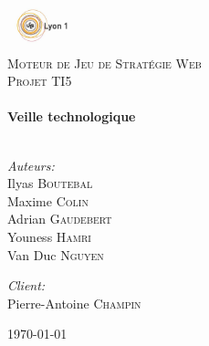 \begin{titlepage}

\begin{center}

\includegraphics[width=0.15\textwidth]{img/logo_ucbl.jpg}\\[1cm]

\textsc{\LARGE Moteur de Jeu de Stratégie Web}\\[1.5cm]

\textsc{\Large Projet TI5}\\[0.5cm]

\HRule \\[0.6cm]
{ \huge \bfseries Veille technologique}\\[0.4cm]

\HRule \\[1.5cm]

\begin{minipage}{0.4\textwidth}
\begin{flushleft} \large
\emph{Auteurs:}\\
Ilyas \textsc{Boutebal}\\ Maxime \textsc{Colin}\\ Adrian \textsc{Gaudebert}\\ Youness \textsc{Hamri}\\ Van Duc \textsc{Nguyen}
\end{flushleft}
\end{minipage}
\begin{minipage}{0.4\textwidth}
\begin{flushright} \large
\emph{Client:} \\
Pierre-Antoine \textsc{Champin}
\end{flushright}
\end{minipage}

\vfill

{\large \today}

\end{center}

\end{titlepage}